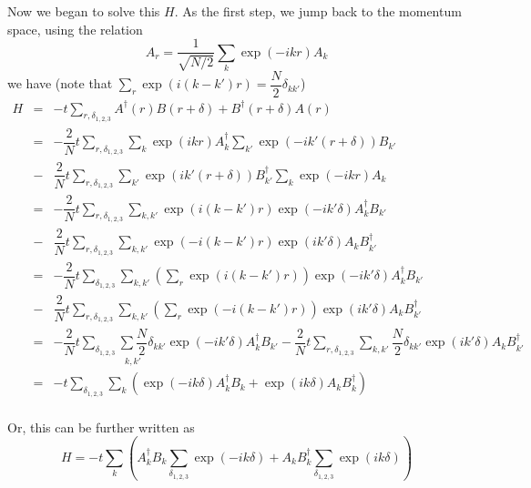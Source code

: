 \documentclass{article}
\begin{document}
Now we began to solve this $H$. As the first step, we jump back to the momentum space, using the relation
\begin{equation}
    A_{r} = \dfrac{1}{\sqrt{N/2}}\underset{k}{\sum}\exp{(-ikr)}A_k
\end{equation}
we have (note that $\underset{r}{\sum}\exp(i(k-k')r)=\dfrac{N}{2}\delta_{kk'}$)
\begin{eqnarray*}  H & = & - t \underset{r, \delta_{1, 2, 3}}{\sum} A^{\dag} (r) B (r + \delta)  + B^{\dag} (r + \delta) A (r)\\  & = & - \dfrac{2}{N} t \underset{r, \delta_{1, 2, 3}}{\sum}  \underset{k}{\sum} \exp (i k r) A_k^{\dag} \underset{k'}{\sum} \exp (- i k'   (r + \delta)) B_{k'}\\  & - & \dfrac{2}{N} t \underset{r, \delta_{1, 2, 3}}{\sum}  \underset{k'}{\sum} \underset{}{\exp (i k'  (r + \delta)) B^{\dag}_{k'}  \underset{k}{\sum}} \exp (- i k r) A_k\\  & = & - \dfrac{2}{N} t \underset{r, \delta_{1, 2, 3}}{\sum} \underset{k,  k'}{\sum} \exp (i (k - k' ) r) \exp (- i k' \delta) A_k^{\dag} B_{k'}\\  & - & \dfrac{2}{N} t \underset{r, \delta_{1, 2, 3}}{\sum} \underset{k,  k'}{\sum} \exp (- i (k - k') r) \exp (i k' \delta) A_k B^{\dag}_{k'}\\  & = & - \dfrac{2}{N} t \underset{\delta_{1, 2, 3}}{\sum} \underset{k,  k'}{\sum} \left( \underset{r}{\sum} \exp (i (k - k' ) r) \right) \exp (- i  k' \delta) A_k^{\dag} B_{k'}\\  & - & \dfrac{2}{N} t \underset{r, \delta_{1, 2, 3}}{\sum} \underset{k,  k'}{\sum} \left( \underset{r}{\sum} \exp (- i (k - k' ) r) \right) \exp (i  k' \delta) A_k B^{\dag}_{k'}\\  & = & - \dfrac{2}{N} t \underset{\delta_{1, 2, 3}}{\sum} \underset{k,  k'}{\sum \dfrac{N}{2}} \delta_{k k'} \exp (- i k' \delta) A_k^{\dag} B_{k'}  - \dfrac{2}{N} t \underset{r, \delta_{1, 2, 3}}{\sum} \underset{k, k'}{\sum}  \dfrac{N}{2} \delta_{k k'} \exp (i k' \delta) A_k B^{\dag}_{k'}\\  & = & - t \underset{\delta_{1, 2, 3}}{\sum} \underset{k}{\sum} (\exp (- i k  \delta) A_k^{\dag} B_k + \exp (i k \delta) A_k B^{\dag}_k)\\  &  & \end{eqnarray*}

Or, this can be further written as
\begin{equation}
    H =  - t   \underset{k}{\sum} \left( A_k^{\dag} B_k \underset{\delta_{1, 2, 3}}{\sum} \exp (- i k   \delta)  +  A_k B^{\dag}_k  \underset{\delta_{1, 2, 3}}{\sum} \exp (i k   \delta)\right) 
\end{equation}
\end{document}
